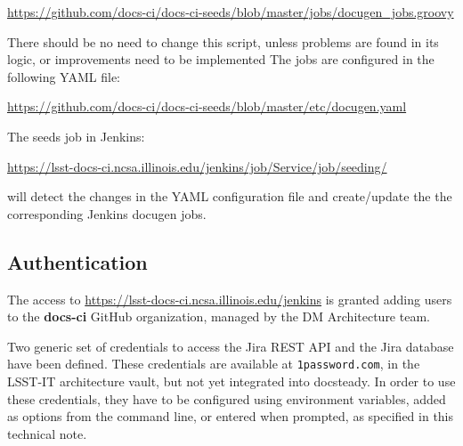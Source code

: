 \url{https://github.com/docs-ci/docs-ci-seeds/blob/master/jobs/docugen_jobs.groovy}

There should be no need to change this script, unless problems are found in its logic, or improvements need to be implemented
The jobs are configured in the following YAML file:

\url{https://github.com/docs-ci/docs-ci-seeds/blob/master/etc/docugen.yaml}

The seeds job in Jenkins:

\url{https://lsst-docs-ci.ncsa.illinois.edu/jenkins/job/Service/job/seeding/}

will detect the changes in the YAML configuration file and create/update the the corresponding Jenkins docugen jobs.



\subsection{Authentication}\label{sec:auth}

The access to \url{https://lsst-docs-ci.ncsa.illinois.edu/jenkins} is granted adding users to the \textbf{docs-ci} GitHub organization, 
managed by the DM Architecture team.

Two generic set of credentials to access the Jira REST API and the Jira database have been defined.
These credentials are available at \texttt{1password.com}, in the LSST-IT architecture vault, but not yet integrated into docsteady.
In order to use these credentials, they have to be configured using environment variables, added as options from the command line, or entered when prompted, as specified in this technical note.
